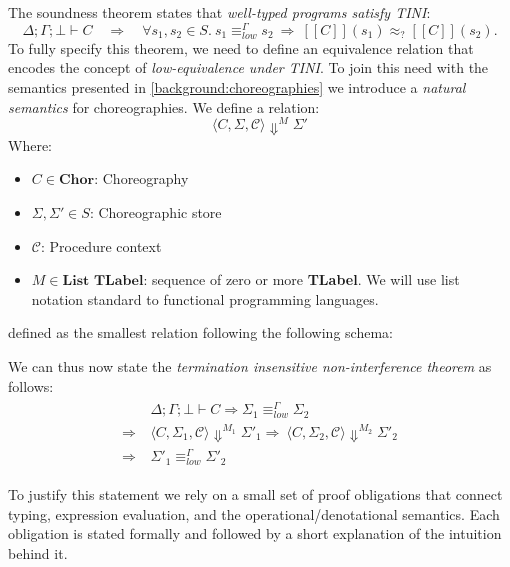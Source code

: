 \documentclass[12pt,a4paper,twoside]{book}
\newcommand{\llbracket}{[\![}
\newcommand{\rrbracket}{]\!]}
\begin{document}
The soundness theorem states that \emph{well-typed programs satisfy TINI}:
\[
  \Delta;\Gamma;\bot \vdash C
  \quad\Longrightarrow\quad
  \forall s_1,s_2 \in S.\ s_1 \equiv^\Gamma_{low} s_2 \ \Rightarrow\ \llbracket C \rrbracket(s_1) \approx_? \llbracket C \rrbracket(s_2).
\]
To fully specify this theorem, we need to define an equivalence relation that encodes the concept of \emph{low-equivalence under TINI}.
To join this need with the semantics presented in \ref{background:choreographies} we introduce a \emph{natural semantics}\cite{kahn1987natural} for choreographies. We define a relation:
$$
\langle C, \Sigma, \mathscr{C} \rangle \Downarrow^M \Sigma'
$$
Where:
\begin{itemize}
	\item $C \in \textbf{Chor}$: Choreography
	\item $\Sigma, \Sigma' \in S$: Choreographic store
	\item $\mathscr{C}$: Procedure context
	\item $M \in \textbf{List TLabel}$: sequence of zero or more \textbf{TLabel}. We will use list notation standard to functional programming languages.
\end{itemize}
defined as the smallest relation following the following schema:

We can thus now state the \emph{termination insensitive non-interference theorem} as follows:
\begin{align} \label{main:def}
\begin{split}
	&\Delta;\Gamma;\bot \vdash C \Rightarrow
	\Sigma_1 \equiv^\Gamma_{low} \Sigma_2 \\ \Rightarrow\ &\langle C, \Sigma_1, \mathscr{C}\rangle \Downarrow^{M_1} \Sigma'_1
	\Rightarrow\ \langle C, \Sigma_2, \mathscr{C}\rangle \Downarrow^{M_2} \Sigma'_2 \\ \Rightarrow\ &\Sigma'_1 \equiv^\Gamma_{low} \Sigma'_2
\end{split}
\end{align}

\medskip

\noindent
To justify this statement we rely on a small set of proof obligations that connect typing, expression evaluation, and the operational/denotational semantics. Each obligation is stated formally and followed by a short explanation of the intuition behind it.
\end{document}
